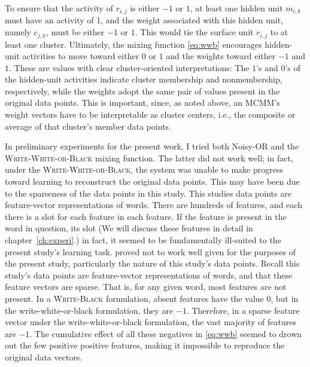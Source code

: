 To ensure that the activity of $r_{i,j}$ is either $-1$ or $1$, at least one hidden unit $m_{i,k}$ must have an activity of 1, and the weight associated with this hidden unit, namely $c_{j,k}$, must be either $-1$ or $1$. This would tie the surface unit $r_{i,j}$ to at least one cluster. Ultimately, the mixing function \eqref{eq:wwb} encourages hidden-unit activities to move  toward either $0$ or $1$ and the weights toward either $-1$ and $1$. These are values with clear cluster-oriented interpretations: The $1$'s and $0$'s of the hidden-unit activities indicate cluster membership and nonmembership, respectively, while the weights adopt the same pair of values present in the original data points. This is important, since, as noted above, an MCMM's weight vectors have to be interpretable as cluster centers, i.e., the composite or average of that cluster's member data points. %

In preliminary experiments for the present work, I tried both Noisy-OR and the \textsc{Write-White-or-Black} mixing function. The latter did not work well; in fact, under the \textsc{Write-White-or-Black}, the system was unable to make progress toward learning to reconstruct the original data points. This may have been due to the sparseness of the data points in this study. This studies data points are feature-vector representations of words. There are hundreds of features, and each there is a slot for each feature in each feature. If the feature is present in the word in question, its slot (We will discuss these features in detail in chapter~\ref{ch:experi}.)
in fact, it seemed to be fundamentally ill-suited to the present study's learning task. proved not to work well given for the purposes of the present study,  particularly the nature of this study's data points. Recall this study's data points are feature-vector representations of words, and that these feature vectors are sparse. That is, for any given word, most features are not present. In a \textsc{Write-Black} formulation, absent features have the value $0$, but in the write-white-or-black formulation, they are $-1$. Therefore, in a sparse feature vector under the write-white-or-black formulation, the vast majority of features are $-1$. The cumulative effect of all these negatives in \eqref{eq:wwb} seemed to drown out the few positive positive features, making it impossible to reproduce the original data vectors. 

